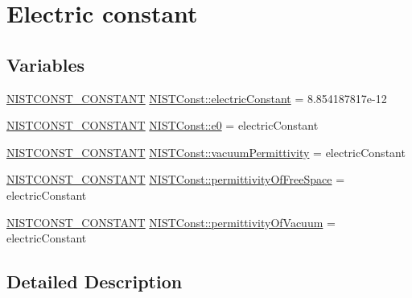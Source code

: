 \hypertarget{group___n_i_s_t_const-_electric_constant}{}\section{Electric constant}
\label{group___n_i_s_t_const-_electric_constant}
\subsection*{Variables}
\begin{DoxyCompactItemize}
\item 
\mbox{\hyperlink{group___n_i_s_t_const-_macros_ga2b0fc1d7452373f816175dd86ce26729}{N\+I\+S\+T\+C\+O\+N\+S\+T\+\_\+\+C\+O\+N\+S\+T\+A\+NT}} \mbox{\hyperlink{group___n_i_s_t_const-_electric_constant_ga8c31e3e43f4ddbc5e9d499a58a8b9de1}{N\+I\+S\+T\+Const\+::electric\+Constant}} = 8.\+854187817e-\/12
\item 
\mbox{\hyperlink{group___n_i_s_t_const-_macros_ga2b0fc1d7452373f816175dd86ce26729}{N\+I\+S\+T\+C\+O\+N\+S\+T\+\_\+\+C\+O\+N\+S\+T\+A\+NT}} \mbox{\hyperlink{group___n_i_s_t_const-_electric_constant_gaaf12fb4810ef85727ab37bd612df8393}{N\+I\+S\+T\+Const\+::e0}} = electric\+Constant
\item 
\mbox{\hyperlink{group___n_i_s_t_const-_macros_ga2b0fc1d7452373f816175dd86ce26729}{N\+I\+S\+T\+C\+O\+N\+S\+T\+\_\+\+C\+O\+N\+S\+T\+A\+NT}} \mbox{\hyperlink{group___n_i_s_t_const-_electric_constant_ga2c514be966450065b16ef9e39a3bfaa9}{N\+I\+S\+T\+Const\+::vacuum\+Permittivity}} = electric\+Constant
\item 
\mbox{\hyperlink{group___n_i_s_t_const-_macros_ga2b0fc1d7452373f816175dd86ce26729}{N\+I\+S\+T\+C\+O\+N\+S\+T\+\_\+\+C\+O\+N\+S\+T\+A\+NT}} \mbox{\hyperlink{group___n_i_s_t_const-_electric_constant_gad36040fb61c99a24582827957b2f37bf}{N\+I\+S\+T\+Const\+::permittivity\+Of\+Free\+Space}} = electric\+Constant
\item 
\mbox{\hyperlink{group___n_i_s_t_const-_macros_ga2b0fc1d7452373f816175dd86ce26729}{N\+I\+S\+T\+C\+O\+N\+S\+T\+\_\+\+C\+O\+N\+S\+T\+A\+NT}} \mbox{\hyperlink{group___n_i_s_t_const-_electric_constant_gaf36275428c537f6690fcf61c8939eca1}{N\+I\+S\+T\+Const\+::permittivity\+Of\+Vacuum}} = electric\+Constant
\end{DoxyCompactItemize}


\subsection{Detailed Description}


